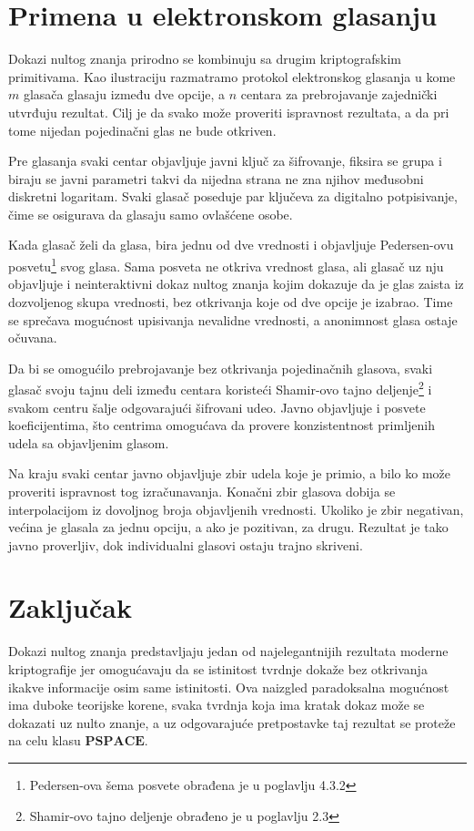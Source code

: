 \section{Primena u elektronskom glasanju}

Dokazi nultog znanja prirodno se kombinuju sa drugim kriptografskim
primitivama. Kao ilustraciju razmatramo protokol elektronskog glasanja
u kome $m$ glasača glasaju između dve opcije, a $n$ centara za
prebrojavanje zajednički utvrđuju rezultat. Cilj je da svako može
proveriti ispravnost rezultata, a da pri tome nijedan pojedinačni glas
ne bude otkriven.

Pre glasanja svaki centar objavljuje javni ključ za šifrovanje, 
fiksira se grupa i biraju se javni parametri takvi da nijedna strana 
ne zna njihov međusobni diskretni logaritam. Svaki glasač poseduje 
par ključeva za digitalno potpisivanje, čime se osigurava da glasaju 
samo ovlašćene osobe.

Kada glasač želi da glasa, bira jednu od dve vrednosti i objavljuje 
Pedersen-ovu posvetu\footnote{Pedersen-ova šema posvete obrađena je 
u poglavlju 4.3.2} svog glasa. Sama posveta ne otkriva vrednost glasa, 
ali glasač uz nju objavljuje i neinteraktivni dokaz nultog znanja 
kojim dokazuje da je glas zaista iz dozvoljenog skupa vrednosti, bez 
otkrivanja koje od dve opcije je izabrao. Time se sprečava mogućnost 
upisivanja nevalidne vrednosti, a anonimnost glasa ostaje očuvana.

Da bi se omogućilo prebrojavanje bez otkrivanja pojedinačnih glasova, 
svaki glasač svoju tajnu deli između centara koristeći Shamir-ovo 
tajno deljenje\footnote{Shamir-ovo tajno deljenje obrađeno je u 
poglavlju 2.3} i svakom centru šalje odgovarajući šifrovani udeo. 
Javno objavljuje i posvete koeficijentima, što centrima omogućava da 
provere konzistentnost primljenih udela sa objavljenim glasom.

Na kraju svaki centar javno objavljuje zbir udela koje je primio, a 
bilo ko može proveriti ispravnost tog izračunavanja. Konačni zbir 
glasova dobija se interpolacijom iz dovoljnog broja objavljenih 
vrednosti. Ukoliko je zbir negativan, većina je glasala za jednu opciju, 
a ako je pozitivan, za drugu. Rezultat je tako javno proverljiv, dok 
individualni glasovi ostaju trajno skriveni.

\section{Zaključak}

Dokazi nultog znanja predstavljaju jedan od najelegantnijih rezultata 
moderne kriptografije jer omogućavaju da se istinitost tvrdnje dokaže 
bez otkrivanja ikakve informacije osim same istinitosti. Ova naizgled 
paradoksalna mogućnost ima duboke teorijske korene, svaka tvrdnja 
koja ima kratak dokaz može se dokazati uz nulto znanje, a uz 
odgovarajuće pretpostavke taj rezultat se proteže na celu klasu 
$\mathbf{PSPACE}$.


